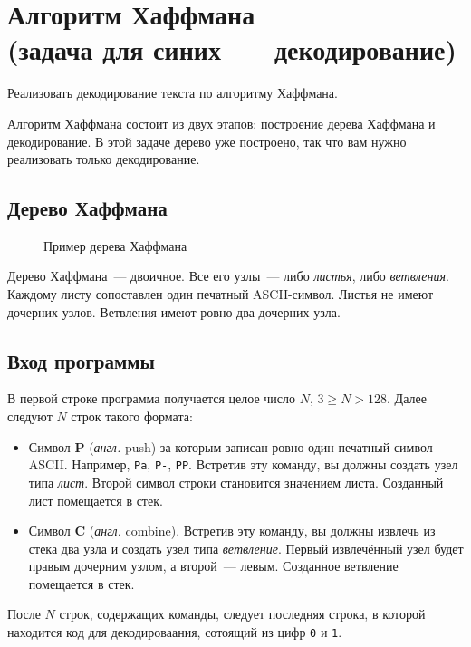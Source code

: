 ﻿\documentclass[a4paper,10pt]{article}
\begin{document}
\section*{Алгоритм Хаффмана\\
(задача для синих~--- декодирование)}

Реализовать декодирование текста по алгоритму Хаффмана.

Алгоритм Хаффмана состоит из двух этапов: построение дерева Хаффмана и декодирование.
В этой задаче дерево уже построено, так что вам нужно реализовать только декодирование.

\subsection*{Дерево Хаффмана}

\begin{figure}[htbp]
    \centering
    
    \caption{Пример дерева Хаффмана}
\end{figure}

Дерево Хаффмана~--- двоичное.
Все его узлы~--- либо \textit{листья}, либо \textit{ветвления}.
Каждому листу сопоставлен один печатный ASCII-символ.
Листья не имеют дочерних узлов.
Ветвления имеют ровно два дочерних узла.

\subsection*{Вход программы}

В первой строке программа получается целое число $N$, $3 \ge N > 128$.
Далее следуют $N$ строк такого формата:

\begin{itemize}
    \item Символ \textbf{P} (\textit{англ.} push) за которым записан ровно один печатный символ ASCII. Например, \texttt{Pa}, \texttt{P-}, \texttt{PP}.
    Встретив эту команду, вы должны создать узел типа \textit{лист}.
    Второй символ строки становится значением листа.
    Созданный лист помещается в стек.
    \item Символ \textbf{C} (\textit{англ.} combine).
    Встретив эту команду, вы должны извлечь из стека два узла и создать узел типа \textit{ветвление}.
    Первый извлечённый узел будет правым дочерним узлом, а второй~--- левым.
    Созданное ветвление помещается в стек.
\end{itemize}

После $N$ строк, содержащих команды, следует последняя строка, в которой находится код для декодироваания, сотоящий из цифр \texttt{0} и \texttt{1}.
\end{document}
